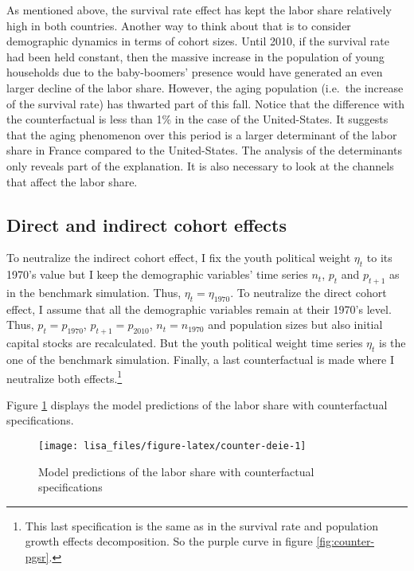 \documentclass[
]{article}
\begin{document}
As mentioned above, the survival rate effect has kept the labor share relatively high in both countries. Another way to think about that is to consider demographic dynamics in terms of cohort sizes. Until 2010, if the survival rate had been held constant, then the massive increase in the population of young households due to the baby-boomers' presence would have generated an even larger decline of the labor share. However, the aging population (i.e.~the increase of the survival rate) has thwarted part of this fall. Notice that the difference with the counterfactual is less than 1\% in the case of the United-States. It suggests that the aging phenomenon over this period is a larger determinant of the labor share in France compared to the United-States.
The analysis of the determinants only reveals part of the explanation. It is also necessary to look at the channels that affect the labor share.

\hypertarget{direct-and-indirect-cohort-effects}{%
\subsection{Direct and indirect cohort effects}\label{direct-and-indirect-cohort-effects}}

To neutralize the indirect cohort effect, I fix the youth political weight \(\eta_t\) to its 1970's value but I keep the demographic variables' time series \(n_t\), \(p_t\) and \(p_{t+1}\) as in the benchmark simulation. Thus, \(\eta_t = \eta_{1970}\). To neutralize the direct cohort effect, I assume that all the demographic variables remain at their 1970's level. Thus, \(p_t = p_{1970}\), \(p_{t+1} = p_{2010}\), \(n_t = n_{1970}\) and population sizes but also initial capital stocks are recalculated. But the youth political weight time series \(\eta_t\) is the one of the benchmark simulation. Finally, a last counterfactual is made where I neutralize both effects.\footnote{This last specification is the same as in the survival rate and population growth effects decomposition. So the purple curve in figure \ref{fig:counter-pgsr}.}

Figure \ref{fig:counter-deie} displays the model predictions of the labor share with counterfactual specifications.

\begin{figure}[!tb]

{\centering \texttt{[image: lisa\_files/figure-latex/counter-deie-1]} 

}

\caption{Model predictions of the labor share with counterfactual specifications}\label{fig:counter-deie}
\end{figure}
\end{document}
